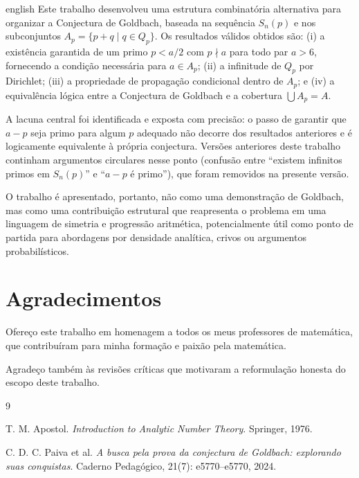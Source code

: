 \documentclass[a4paper,11pt]{article}
\theoremstyle{definition}
\theoremstyle{remark}
\begin{document}
\begin{otherlanguage*}{english}
		Este trabalho desenvolveu uma estrutura combinatória alternativa para
		organizar a Conjectura de Goldbach, baseada na sequência \(S_n(p)\) e nos
		subconjuntos \(A_p = \{p + q \mid q \in Q_p\}\). Os resultados válidos
		obtidos são: (i) a existência garantida de um primo \(p < a/2\) com
		\(p \nmid a\) para todo par \(a > 6\), fornecendo a condição necessária
		para \(a \in A_p\); (ii) a infinitude de \(Q_p\) por Dirichlet; (iii) a
		propriedade de propagação condicional dentro de \(A_p\); e (iv) a
		equivalência lógica entre a Conjectura de Goldbach e a cobertura
		\(\bigcup A_p = A\).
		
		A lacuna central foi identificada e exposta com precisão: o passo de
		garantir que \(a - p\) seja primo para algum \(p\) adequado não decorre
		dos resultados anteriores e é logicamente equivalente à própria conjectura.
		Versões anteriores deste trabalho continham argumentos circulares nesse
		ponto (confusão entre ``existem infinitos primos em \(S_n(p)\)'' e
		``\(a - p\) é primo''), que foram removidos na presente versão.
		
		O trabalho é apresentado, portanto, não como uma demonstração de Goldbach,
		mas como uma contribuição estrutural que reapresenta o problema em uma
		linguagem de simetria e progressão aritmética, potencialmente útil como
		ponto de partida para abordagens por densidade analítica, crivos ou
		argumentos probabilísticos.
		
		
		\section*{Agradecimentos}
		
		Ofereço este trabalho em homenagem a todos os meus professores de
		matemática, que contribuíram para minha formação e paixão pela matemática.
		
		Agradeço também às revisões críticas que motivaram a reformulação honesta
		do escopo deste trabalho.
		
		
		\begin{thebibliography}{9}
			
			T. M. Apostol.
			\textit{Introduction to Analytic Number Theory}.
			Springer, 1976.
			
			C. D. C. Paiva et al.
			\textit{A busca pela prova da conjectura de Goldbach: explorando suas
				conquistas}.
			Caderno Pedagógico, 21(7): e5770--e5770, 2024.
			

\end{thebibliography}
\end{otherlanguage*}
\end{document}
